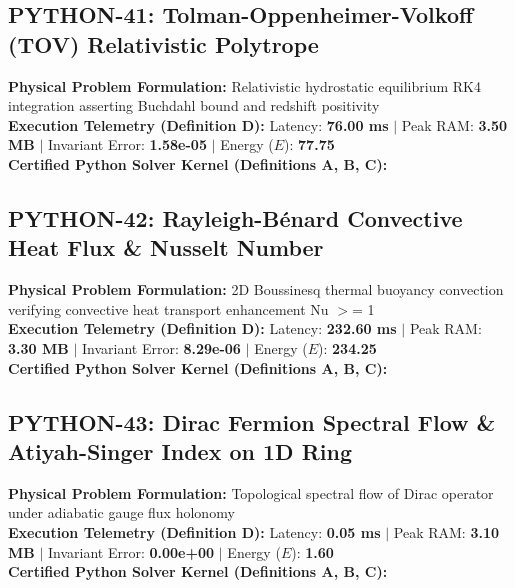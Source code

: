 \subsection{PYTHON-41: Tolman-Oppenheimer-Volkoff (TOV) Relativistic Polytrope}
\textbf{Physical Problem Formulation:} Relativistic hydrostatic equilibrium RK4 integration asserting Buchdahl bound and redshift positivity\\
\textbf{Execution Telemetry (Definition D):} Latency: \textbf{76.00 ms} $|$ Peak RAM: \textbf{3.50 MB} $|$ Invariant Error: \textbf{1.58e-05} $|$ Energy ($E$): \textbf{77.75}\\

\textbf{Certified Python Solver Kernel (Definitions A, B, C):}


\vspace{1em}
\subsection{PYTHON-42: Rayleigh-Bénard Convective Heat Flux \& Nusselt Number}
\textbf{Physical Problem Formulation:} 2D Boussinesq thermal buoyancy convection verifying convective heat transport enhancement Nu $>$= 1\\
\textbf{Execution Telemetry (Definition D):} Latency: \textbf{232.60 ms} $|$ Peak RAM: \textbf{3.30 MB} $|$ Invariant Error: \textbf{8.29e-06} $|$ Energy ($E$): \textbf{234.25}\\

\textbf{Certified Python Solver Kernel (Definitions A, B, C):}


\vspace{1em}
\subsection{PYTHON-43: Dirac Fermion Spectral Flow \& Atiyah-Singer Index on 1D Ring}
\textbf{Physical Problem Formulation:} Topological spectral flow of Dirac operator under adiabatic gauge flux holonomy\\
\textbf{Execution Telemetry (Definition D):} Latency: \textbf{0.05 ms} $|$ Peak RAM: \textbf{3.10 MB} $|$ Invariant Error: \textbf{0.00e+00} $|$ Energy ($E$): \textbf{1.60}\\

\textbf{Certified Python Solver Kernel (Definitions A, B, C):}


\vspace{1em}
